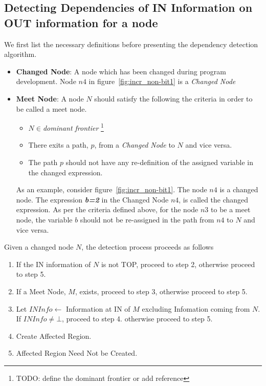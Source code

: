 \documentclass[11pt,a4paper,openright]{report}
\begin{document}
\subsection{Detecting Dependencies of IN Information on OUT information for a node}
We first list the necessary definitions before presenting the dependency detection algorithm.

\begin{itemize}
 \item \textbf{Changed Node}: A node which has been changed during program development. Node $n4$ in figure~\ref{fig:incr_non-bit1} is a \textit{Changed Node}
\item \textbf{Meet Node}:
A node $N$ should satisfy the following the criteria in order to be called a meet node.
\begin{itemize}
\item $N\in$\textit{dominant frontier} \footnote{TODO: define the dominant frontier or add reference}
\item There exits a path, $p$, from a \textit{Changed Node} to $N$ and vice versa.
\item The path $p$ should not have any re-definition of the assigned variable in the changed expression. 
\end{itemize}

As an example, consider figure~\ref{fig:incr_non-bit1}. The node $n4$ is a changed node.
The expression \emph{\textbf{b=2}} in the Changed Node $n4$, is called the changed expression.
As per the criteria defined above, for the node $n3$ to be a meet node, the variable $b$ should not be 
re-assigned in the path from $n4$ to $N$ and vice versa.
\end{itemize}

Given a changed node $N$, the detection process proceeds as follows
\begin{enumerate}
 \item If the IN information of $N$ is not TOP, proceed to step 2, otherwise proceed to step 5.
 \item If a Meet Node, $M$, exists, proceed to step 3, otherwise proceed to step 5.
 \item Let $INInfo \gets$ Information at IN of $M$ excluding Infomation coming from $N$. If $INInfo \ne \bot$, proceed to step 4.
 otherwise proceed to step 5.
 \item Create Affected Region.
 \item Affected Region Need Not be Created.
 \end{enumerate}
 
\end{document}
